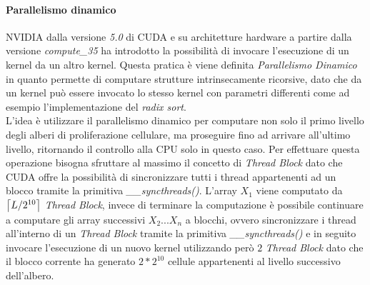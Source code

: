 \paragraph{Parallelismo dinamico}

NVIDIA dalla versione \textit{5.0} di CUDA e su architetture hardware a partire
dalla versione \textit{compute\_35} ha introdotto la possibilità di invocare
l'esecuzione di un kernel da un altro kernel.
Questa pratica è viene definita
\textit{Parallelismo Dinamico}\cite{jones2012introduction} in quanto permette
di computare strutture intrinsecamente ricorsive, dato che da un kernel può
essere invocato lo stesso kernel con parametri differenti come ad 
esempio l'implementazione del \textit{radix sort}\cite{merrill2011high}.
\\
L'idea è utilizzare il parallelismo dinamico per computare non solo il primo
livello degli alberi di proliferazione cellulare, ma proseguire fino ad arrivare
all'ultimo livello, ritornando il controllo alla CPU solo in questo caso.
Per effettuare questa operazione bisogna sfruttare al massimo il concetto di
\textit{Thread Block} dato che CUDA offre la possibilità di sincronizzare
tutti i thread appartenenti ad un blocco tramite la primitiva
\textit{\_\_syncthreads()}\cite{jones2012introduction}.
L'array $X_{1}$ viene computato da $\ceil*{L/2^{10}}$ \textit{Thread Block},
invece di terminare la computazione è possibile continuare a computare
gli array successivi $X_{2}...X_{n}$ a blocchi, ovvero sincronizzare i thread
all'interno di un \textit{Thread Block} tramite la primitiva
\textit{\_\_syncthreads()} e in seguito invocare l'esecuzione di un nuovo kernel
utilizzando però $2$ \textit{Thread Block} dato che il blocco corrente ha
generato $2 * 2^{10}$ cellule appartenenti al livello successivo dell'albero.
\\
